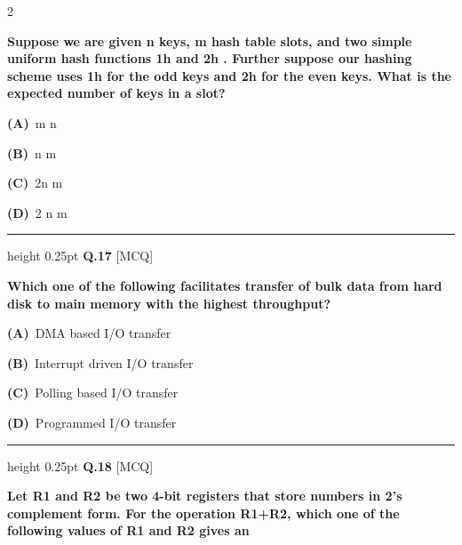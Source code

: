 \documentclass[a4paper,10pt,twoside]{article}
\begin{document}
\begin{multicols}{2}
{\bfseries Suppose we are given n keys, m hash table slots, and two simple uniform hash
functions
1h and
2h . Further suppose our hashing scheme uses
1h for the odd keys
and
2h for the even keys. What is the expected number of keys in a slot? \par}
\par\vspace{2pt}\noindent
\textbf{(A)}~m \newline n\par\vspace{2pt}\noindent
\textbf{(B)}~n \newline m\par\vspace{2pt}\noindent
\textbf{(C)}~2n \newline m\par\vspace{2pt}\noindent
\textbf{(D)}~2 \newline n \newline m
\par\vspace{6pt}\hrule height 0.25pt\vspace{6pt}
\noindent\textbf{Q.17} \hfill {\footnotesize\textsf{[MCQ]}}
\par\vspace{2pt}
{\bfseries Which one of the following facilitates transfer of bulk data from hard disk to main
memory with the highest throughput? \par}
\par\vspace{2pt}\noindent
\textbf{(A)}~DMA based I/O transfer\par\vspace{2pt}\noindent
\textbf{(B)}~Interrupt driven I/O transfer\par\vspace{2pt}\noindent
\textbf{(C)}~Polling based I/O transfer\par\vspace{2pt}\noindent
\textbf{(D)}~Programmed I/O transfer
\par\vspace{6pt}\hrule height 0.25pt\vspace{6pt}
\noindent\textbf{Q.18} \hfill {\footnotesize\textsf{[MCQ]}}
\par\vspace{2pt}
{\bfseries Let R1 and R2 be two 4-bit registers that store numbers in 2's complement form.
For the operation R1+R2, which one of the following values of R1 and R2 gives an
}
\end{multicols}
\end{document}
